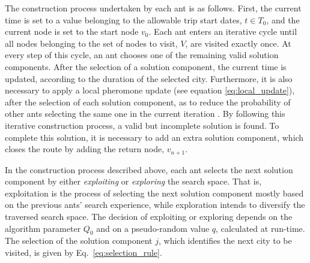 The construction process undertaken by each ant is as follows. First, the current time is set to a value belonging to the allowable trip start dates, $t \in T_0$, and the current node is set to the start node $v_0$. Each ant enters an iterative cycle until all nodes belonging to the set of nodes to visit, $V$, are visited exactly once. At every step of this cycle, an ant chooses one of the remaining valid solution components. After the selection of a solution component, the current time is updated, according to the duration of the selected city. Furthermore, it is also necessary to apply a local pheromone update (see equation \ref{eq:local_update}), after the selection of each solution component, as to reduce the probability of other ants selecting the same one in the current iteration \cite{aco_tsp}. By following this iterative construction process, a valid but incomplete solution is found. To complete this solution, it is necessary to add an extra solution component, which closes the route by adding the return node, $v_{n+1}$.



In the construction process described above, each ant selects the next solution component by either \textit{exploiting} or \textit{exploring} the search space. That is, exploitation is the process of selecting the next solution component mostly based on the previous ants' search experience, while exploration intends to diversify the traversed search space. The decision of exploiting or exploring depends on the algorithm parameter $Q_0$ and on a pseudo-random value $q$, calculated at run-time. The selection of the solution component $j$, which identifies the next city to be visited, is given by Eq.~\ref{eq:selection_rule}. 

